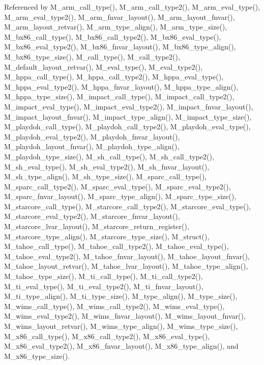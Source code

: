 Referenced by M\_\-arm\_\-call\_\-type(), M\_\-arm\_\-call\_\-type2(), M\_\-arm\_\-eval\_\-type(), M\_\-arm\_\-eval\_\-type2(), M\_\-arm\_\-fnvar\_\-layout(), M\_\-arm\_\-layout\_\-fnvar(), M\_\-arm\_\-layout\_\-retvar(), M\_\-arm\_\-type\_\-align(), M\_\-arm\_\-type\_\-size(), M\_\-bx86\_\-call\_\-type(), M\_\-bx86\_\-call\_\-type2(), M\_\-bx86\_\-eval\_\-type(), M\_\-bx86\_\-eval\_\-type2(), M\_\-bx86\_\-fnvar\_\-layout(), M\_\-bx86\_\-type\_\-align(), M\_\-bx86\_\-type\_\-size(), M\_\-call\_\-type(), M\_\-call\_\-type2(), M\_\-default\_\-layout\_\-retvar(), M\_\-eval\_\-type(), M\_\-eval\_\-type2(), M\_\-hppa\_\-call\_\-type(), M\_\-hppa\_\-call\_\-type2(), M\_\-hppa\_\-eval\_\-type(), M\_\-hppa\_\-eval\_\-type2(), M\_\-hppa\_\-fnvar\_\-layout(), M\_\-hppa\_\-type\_\-align(), M\_\-hppa\_\-type\_\-size(), M\_\-impact\_\-call\_\-type(), M\_\-impact\_\-call\_\-type2(), M\_\-impact\_\-eval\_\-type(), M\_\-impact\_\-eval\_\-type2(), M\_\-impact\_\-fnvar\_\-layout(), M\_\-impact\_\-layout\_\-fnvar(), M\_\-impact\_\-type\_\-align(), M\_\-impact\_\-type\_\-size(), M\_\-playdoh\_\-call\_\-type(), M\_\-playdoh\_\-call\_\-type2(), M\_\-playdoh\_\-eval\_\-type(), M\_\-playdoh\_\-eval\_\-type2(), M\_\-playdoh\_\-fnvar\_\-layout(), M\_\-playdoh\_\-layout\_\-fnvar(), M\_\-playdoh\_\-type\_\-align(), M\_\-playdoh\_\-type\_\-size(), M\_\-sh\_\-call\_\-type(), M\_\-sh\_\-call\_\-type2(), M\_\-sh\_\-eval\_\-type(), M\_\-sh\_\-eval\_\-type2(), M\_\-sh\_\-fnvar\_\-layout(), M\_\-sh\_\-type\_\-align(), M\_\-sh\_\-type\_\-size(), M\_\-sparc\_\-call\_\-type(), M\_\-sparc\_\-call\_\-type2(), M\_\-sparc\_\-eval\_\-type(), M\_\-sparc\_\-eval\_\-type2(), M\_\-sparc\_\-fnvar\_\-layout(), M\_\-sparc\_\-type\_\-align(), M\_\-sparc\_\-type\_\-size(), M\_\-starcore\_\-call\_\-type(), M\_\-starcore\_\-call\_\-type2(), M\_\-starcore\_\-eval\_\-type(), M\_\-starcore\_\-eval\_\-type2(), M\_\-starcore\_\-fnvar\_\-layout(), M\_\-starcore\_\-lvar\_\-layout(), M\_\-starcore\_\-return\_\-register(), M\_\-starcore\_\-type\_\-align(), M\_\-starcore\_\-type\_\-size(), M\_\-struct(), M\_\-tahoe\_\-call\_\-type(), M\_\-tahoe\_\-call\_\-type2(), M\_\-tahoe\_\-eval\_\-type(), M\_\-tahoe\_\-eval\_\-type2(), M\_\-tahoe\_\-fnvar\_\-layout(), M\_\-tahoe\_\-layout\_\-fnvar(), M\_\-tahoe\_\-layout\_\-retvar(), M\_\-tahoe\_\-lvar\_\-layout(), M\_\-tahoe\_\-type\_\-align(), M\_\-tahoe\_\-type\_\-size(), M\_\-ti\_\-call\_\-type(), M\_\-ti\_\-call\_\-type2(), M\_\-ti\_\-eval\_\-type(), M\_\-ti\_\-eval\_\-type2(), M\_\-ti\_\-fnvar\_\-layout(), M\_\-ti\_\-type\_\-align(), M\_\-ti\_\-type\_\-size(), M\_\-type\_\-align(), M\_\-type\_\-size(), M\_\-wims\_\-call\_\-type(), M\_\-wims\_\-call\_\-type2(), M\_\-wims\_\-eval\_\-type(), M\_\-wims\_\-eval\_\-type2(), M\_\-wims\_\-fnvar\_\-layout(), M\_\-wims\_\-layout\_\-fnvar(), M\_\-wims\_\-layout\_\-retvar(), M\_\-wims\_\-type\_\-align(), M\_\-wims\_\-type\_\-size(), M\_\-x86\_\-call\_\-type(), M\_\-x86\_\-call\_\-type2(), M\_\-x86\_\-eval\_\-type(), M\_\-x86\_\-eval\_\-type2(), M\_\-x86\_\-fnvar\_\-layout(), M\_\-x86\_\-type\_\-align(), and M\_\-x86\_\-type\_\-size().
